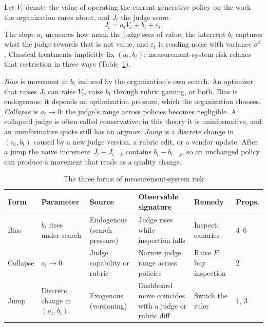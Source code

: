 \documentclass[acmsmall,screen,review,anonymous]{acmart}
\theoremstyle{acmdefinition}
\begin{document}
Let $V_t$ denote the value of operating the current generative policy on the work the organization cares about, and $J_t$ the judge score:
\begin{equation}\label{eq:obs}
J_t = a_t V_t + b_t + \varepsilon_t .
\end{equation}
The slope $a_t$ measures how much the judge sees of value, the intercept $b_t$ captures what the judge rewards that is not value, and $\varepsilon_t$ is reading noise with variance $\sigma^2$. Classical treatments implicitly fix $(a_t,b_t)$; measurement-system risk relaxes that restriction in three ways (Table~\ref{tab:forms}).

\emph{Bias} is movement in $b_t$ induced by the organization's own search. An optimizer that raises $J_t$ can raise $V_t$, raise $b_t$ through rubric gaming, or both. Bias is endogenous: it depends on optimization pressure, which the organization chooses. \emph{Collapse} is $a_t \to 0$: the judge's range across policies becomes negligible. A collapsed judge is often called conservative; in this theory it is uninformative, and an uninformative quote still has an argmax. \emph{Jump} is a discrete change in $(a_t,b_t)$ caused by a new judge version, a rubric edit, or a vendor update. After a jump the naive increment $J_t - J_{t-k}$ contains $b_t - b_{t-k}$, so an unchanged policy can produce a movement that reads as a quality change.

\begin{table}[t]
\caption{The three forms of measurement-system risk}\label{tab:forms}
\small
\begin{tabular}{@{}p{1.2cm}p{2.0cm}p{2.1cm}p{3.1cm}p{2.3cm}p{1.0cm}@{}}
\toprule
Form & Parameter & Source & Observable signature & Remedy & Props. \\
\midrule
Bias & $b_t$ rises under search & Endogenous (search pressure) & Judge rises while inspection falls & Inspect; canaries & 4--6 \\
Collapse & $a_t \to 0$ & Judge capability or rubric & Narrow judge range across policies & Raise $F$; buy inspection & 2 \\
Jump & Discrete change in $(a_t,b_t)$ & Exogenous (versioning) & Dashboard move coincides with a judge or rubric diff & Switch the ruler & 1, 3 \\
\bottomrule
\end{tabular}
\end{table}
\end{document}
